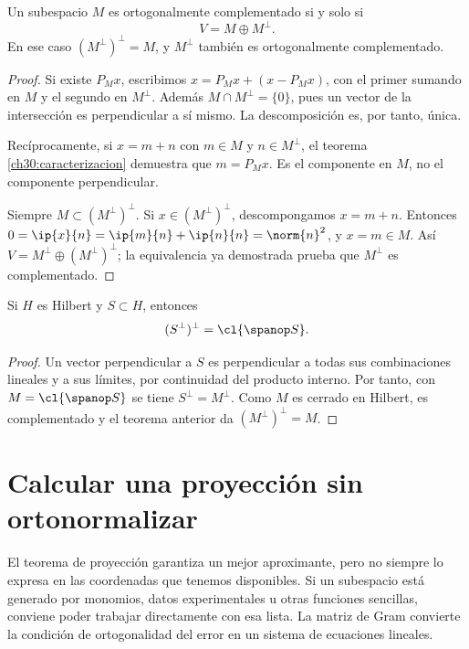 \begin{teorema}\label{ch30:descomposicion}
Un subespacio $M$ es ortogonalmente complementado si y solo si
\[
 V=M\oplus M^{\perp}.
\]
En ese caso $(M^{\perp})^{\perp}=M$, y $M^{\perp}$ también es ortogonalmente complementado.
\end{teorema}
\begin{proof}
Si existe $P_Mx$, escribimos $x=P_Mx+(x-P_Mx)$, con el primer sumando en $M$ y el segundo en $M^{\perp}$. Además $M\cap M^{\perp}=\{0\}$, pues un vector de la intersección es perpendicular a sí mismo. La descomposición es, por tanto, única.

Recíprocamente, si $x=m+n$ con $m\in M$ y $n\in M^{\perp}$, el teorema \ref{ch30:caracterizacion} demuestra que $m=P_Mx$. Es el componente en $M$, no el componente perpendicular.

Siempre $M\subset(M^{\perp})^{\perp}$. Si $x\in(M^{\perp})^{\perp}$, descompongamos $x=m+n$. Entonces $0=\ip{x}{n}=\ip{m}{n}+\ip{n}{n}=\norm{n}^{2}$, y $x=m\in M$. Así $V=M^{\perp}\oplus(M^{\perp})^{\perp}$; la equivalencia ya demostrada prueba que $M^{\perp}$ es complementado.
\end{proof}

\begin{corolario}\label{ch30:doble}
Si $H$ es Hilbert y $S\subset H$, entonces
\[
 (S^{\perp})^{\perp}=\cl{\spanop S}.
\]
\end{corolario}
\begin{proof}
Un vector perpendicular a $S$ es perpendicular a todas sus combinaciones lineales y a sus límites, por continuidad del producto interno. Por tanto, con $M=\cl{\spanop S}$ se tiene $S^{\perp}=M^{\perp}$. Como $M$ es cerrado en Hilbert, es complementado y el teorema anterior da $(M^{\perp})^{\perp}=M$.
\end{proof}

\section{Calcular una proyección sin ortonormalizar}\label{ampl:gram}
El teorema de proyección garantiza un mejor aproximante, pero no siempre lo expresa en las coordenadas que tenemos disponibles. Si un subespacio está generado por monomios, datos experimentales u otras funciones sencillas, conviene poder trabajar directamente con esa lista. La matriz de Gram convierte la condición de ortogonalidad del error en un sistema de ecuaciones lineales.

